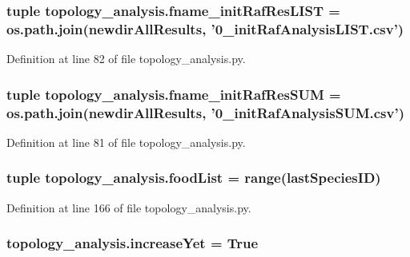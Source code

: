 \hypertarget{a00157_ae1a425430860aba59e0118dbe1ac2163}{
\subsubsection[{fname\-\_\-init\-Raf\-Res\-L\-I\-S\-T}]{\setlength{\rightskip}{0pt plus 5cm}tuple topology\-\_\-analysis.\-fname\-\_\-init\-Raf\-Res\-L\-I\-S\-T = os.\-path.\-join({\bf newdir\-All\-Results}, '0\-\_\-init\-Raf\-Analysis\-L\-I\-S\-T.\-csv')}}\label{a00157_ae1a425430860aba59e0118dbe1ac2163}


Definition at line 82 of file topology\-\_\-analysis.\-py.

\hypertarget{a00157_ac3f3b9f72351b39261d33caf3d22d03e}{
\subsubsection[{fname\-\_\-init\-Raf\-Res\-S\-U\-M}]{\setlength{\rightskip}{0pt plus 5cm}tuple topology\-\_\-analysis.\-fname\-\_\-init\-Raf\-Res\-S\-U\-M = os.\-path.\-join({\bf newdir\-All\-Results}, '0\-\_\-init\-Raf\-Analysis\-S\-U\-M.\-csv')}}\label{a00157_ac3f3b9f72351b39261d33caf3d22d03e}


Definition at line 81 of file topology\-\_\-analysis.\-py.

\hypertarget{a00157_a96850fa3d62df1176a8d7a5b988f4a32}{
\subsubsection[{food\-List}]{\setlength{\rightskip}{0pt plus 5cm}tuple topology\-\_\-analysis.\-food\-List = range({\bf last\-Species\-I\-D})}}\label{a00157_a96850fa3d62df1176a8d7a5b988f4a32}


Definition at line 166 of file topology\-\_\-analysis.\-py.

\hypertarget{a00157_a5a68ea0f110f2fae7b8f03d1ce52d54d}{
\subsubsection[{increase\-Yet}]{\setlength{\rightskip}{0pt plus 5cm}topology\-\_\-analysis.\-increase\-Yet = True}}\label{a00157_a5a68ea0f110f2fae7b8f03d1ce52d54d}


